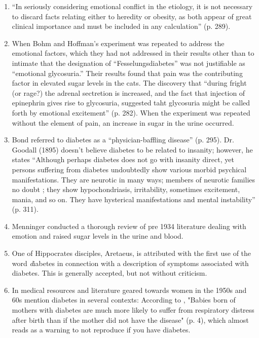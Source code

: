 \documentclass[12pt]{article}
\begin{document}
\begin{enumerate}
\item \citep{daniels_role_1948}
``In seriously considering emotional conflict in the etiology, it is not necessary to discard facts relating either to heredity or obesity, as both appear of great clinical importance and must be included in any calculation'' (p. 289). 
\item \citep{cannon_1916_bodily}
When Bohm and Hoffman's experiment was repeated to address the emotional factors, which they had not addressed in their results other than to intimate that the designation of ``Fesselungsdiabetes'' was not justifiable as ``emotional glycosuria.'' Their results found that pain was the contributing factor in elevated sugar levels in the cats. The discovery that ``during fright (or rage?) the adrenal sectretion is increased, and the fact that injection of epinephrin gives rise to glycosuria, suggested taht glycosuria might be called forth by emotional excitement'' (p. 282). When the experiment was repeated without the element of pain, an increase in sugar in the urine occurred. 

\item \citep{bond_1895_relation}
Bond referred to diabetes as a ``physician-baffling disease'' (p. 295).
Dr. Goodall (1895) doesn't believe diabetes to be related to insanity; however, he states ``Although perhaps diabetes does not go with insanity direct, yet persons suffering from diabetes undoubtedly show
various morbid psychical manifestations. They are neurotic in many ways; members of neurotic families no doubt ; they show hypochondriasis, irritability, sometimes excitement, mania, and so on. They have hysterical manifestations and mental instability'' (p. 311). 

\item \citep{menninger_1935_psychological} Menninger conducted a thorough review of pre 1934 literature dealing with emotion and raised sugar levels in the urine and blood. 

\item \citep{major_1933_classic}
One of Hippocrates disciples, Aretaeus, is attributed with the first use of the word \textit diabetes in connection with a description of symptoms associated with diabetes. This is generally accepted, but not without criticism. 

\item \citep{fishbein_1959_modern}
In medical resources and literature geared towards women in the 1950s and 60s mention diabetes in several contexts:
According to \citet{McKusick_1959_Health}, "Babies born of mothers with diabetes are much more likely to suffer from respiratory distress after birth than if the mother did not have the disease" (p. 4), which almost reads as a warning to not reproduce if you have diabetes. 


\end{enumerate}
\end{document}

